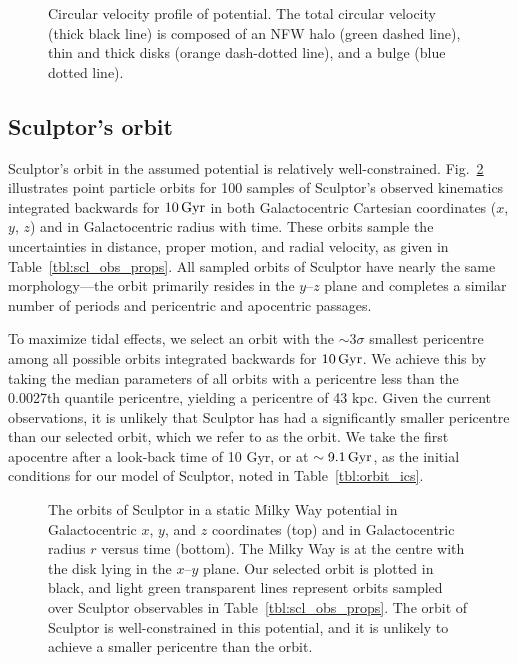 \begin{figure}
\centering
{}
\caption[Circular velocity of the Milky Way potential]{Circular velocity
profile of \citet{EP2020} potential. The total circular velocity (thick
black line) is composed of an NFW halo (green dashed line), thin and
thick \citet{miyamoto+nagai1975} disks (orange dash-dotted line), and a
\citet{hernquist1990} bulge (blue dotted
line).}\label{fig:v_circ_potential}
\end{figure}

\subsection{Sculptor's orbit}\label{sec:scl_smallperi}

Sculptor's orbit in the assumed potential is relatively
well-constrained. Fig.~\ref{fig:scl_orbits} illustrates point particle
orbits for 100 samples of Sculptor's observed kinematics integrated
backwards for \(10\,{\rm Gyr}\) in both Galactocentric Cartesian coordinates
(\(x\), \(y\), \(z\)) and in Galactocentric radius with time. These
orbits sample the uncertainties in distance, proper motion, and radial
velocity, as given in Table~\ref{tbl:scl_obs_props}. All sampled orbits
of Sculptor have nearly the same morphology---the orbit primarily
resides in the \(y\)--\(z\) plane and completes a similar number of
periods and pericentric and apocentric passages.

To maximize tidal effects, we select an orbit with the \(\sim 3\sigma\)
smallest pericentre among all possible orbits integrated backwards for
\(10\,{\rm Gyr}\). We achieve this by taking the median parameters of all
orbits with a pericentre less than the 0.0027th quantile pericentre,
yielding a pericentre of 43 kpc. Given the current observations, it is
unlikely that Sculptor has had a significantly smaller pericentre than
our selected orbit, which we refer to as the \smallperi{} orbit. We take
the first apocentre after a look-back time of 10 Gyr, or at
\(\sim9.1\,{\rm Gyr}\), as the initial conditions for our model of Sculptor,
noted in Table~\ref{tbl:orbit_ics}.

\begin{figure}
\centering
{}
\caption[Sculptor's possible orbits]{The orbits of Sculptor in a static
Milky Way potential in Galactocentric \(x\), \(y\), and \(z\)
coordinates (top) and in Galactocentric radius \(r\) versus time
(bottom). The Milky Way is at the centre with the disk lying in the
\(x\)--\(y\) plane. Our selected \smallperi{} orbit is plotted in black,
and light green transparent lines represent orbits sampled over Sculptor
observables in Table~\ref{tbl:scl_obs_props}. The orbit of Sculptor is
well-constrained in this potential, and it is unlikely to achieve a
smaller pericentre than the \smallperi{} orbit.}\label{fig:scl_orbits}
\end{figure}

